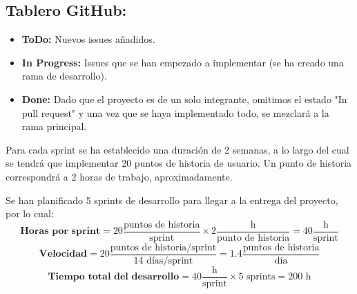 \subsection{Tablero GitHub:}
\begin{itemize}
	\item \textbf{ToDo:} Nuevos issues añadidos.
	\item \textbf{In Progress:} Issues que se han empezado a implementar (se ha creado una rama de desarrollo).
	\item \textbf{Done:} Dado que el proyecto es de un solo integrante, omitimos el estado "In pull request" y una vez que se haya implementado todo, se mezclará a la rama principal.
\end{itemize}
\par Para cada sprint se ha establecido una duración de 2 semanas, a lo largo del cual se tendrá que implementar 20 puntos de historia de usuario. Un punto de historia correspondrá a 2 horas de trabajo, aproximadamente.
\par Se han planificado 5 sprints de desarrollo para llegar a la entrega del proyecto, por lo cual:
\[ \textbf{Horas por sprint} = 20 \frac{\text{puntos de historia}}{\text{sprint}} \times 2 \frac{\text{h}}{\text{punto de historia}} = 40 \frac{\text{h}}{\text{sprint}} \]
\[ \textbf{Velocidad} = 20 \frac{\text{puntos de historia/sprint}}{\text{14 días/sprint}} = 1.4 \frac{\text{puntos de historia}}{\text{día}} \]
\[ \textbf{Tiempo total del desarrollo} = 40 \frac{\text{h}}{\text{sprint}} \times 5 \text{ sprints} = 200 \text{ h} \]

